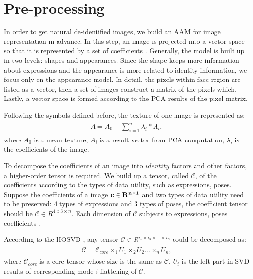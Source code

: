 	\section{Pre-processing}	
	\label{sec:pre_processing}
	In order to get natural de-identified images, we build an AAM for image representation in advance.
	In this step, an image is projected into a vector space so that it is represented by a set of coefficients \cite{Matthews_04}. 
	Generally, the model
	is built up in two levels: shapes and appearances. Since the shape keeps more information about expressions and the appearance is more
	related to identity information, we focus only on the appearance model. In detail, the pixels within face region are listed as a vector, 
	then a set of images construct a matrix of the pixels which. Lastly, a vector space is formed according to the PCA results
	of the pixel matrix. 

	Following the symbols defined before, the texture of one image is represented as:
	\begin{align}
		\label{equ:aam}
		\begin{split}
			A = A_0 + \sum_{i=1}^{n}\lambda_i * A_i,
		\end{split}
	\end{align}
	where $A_0$ is a mean texture, $A_i$ is a result vector from PCA computation, $\lambda_i$ is the coefficients of the image.

	To decompose the coefficients of an image into $identity$ factors and other factors, a higher-order tensor is required.
	We build up a tensor, called $\mathcal{C}$, of the coefficients according to the types of data utility, such as 
	expressions, poses. Suppose the coefficients of a image $\bf{c} \in R^{n \times 1}$ and two types of data
	utility need to be preserved: $4$ types of expressions and $3$ types of poses, the coefficient tensor should be $\mathcal{C} \in 
	R^{4 \times 3 \times n}$. Each dimension of $\mathcal{C}$ subjects to expressions, poses coefficients \cite{VasilescuT03,Feng12}. 

	According to the HOSVD \cite{Lathauwer00,Kolda09}, any tensor $\mathcal{C} \in R^{i_1 \times i_2 \times ... \times i_n}$ could be decomposed
	as:
	\begin{align}
		\label{equ:hosvd_1}
		\begin{split}
			\mathcal{C} = \mathcal{C}_{core} \times_1 U_1 \times_2 U_2 ... \times_n U_n,
		\end{split}
	\end{align}
	where $\mathcal{C}_{core}$ is a core tensor whose size is the same as $\mathcal{C}$, $U_i$ is the left part in SVD results 
	of corresponding mode-$i$ flattening of $\mathcal{C}$.


